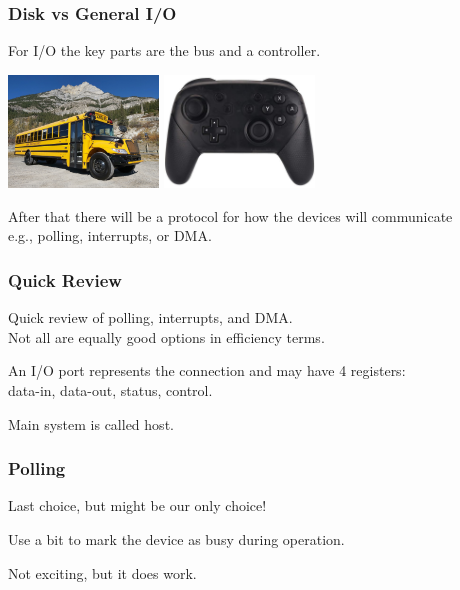 \begin{frame}
\frametitle{Disk vs General I/O}

For I/O the key parts are the bus and a controller. 

\begin{center}
	\includegraphics[width=0.3\textwidth]{images/bus.jpg}
	\includegraphics[width=0.3\textwidth]{images/controller.jpg}
\end{center}

After that there will be a protocol for how the devices will communicate\\
\quad e.g., polling, interrupts, or DMA.

\end{frame}


\begin{frame}
\frametitle{Quick Review}

Quick review of polling, interrupts, and DMA.\\
\quad Not all are equally good options in efficiency terms.

An I/O port represents the connection and may have 4 registers:\\
\quad data-in, data-out, status, control.

Main system is called \alert{host}.

\end{frame}


\begin{frame}
\frametitle{Polling}

Last choice, but might be our only choice!

Use a bit to mark the device as busy during operation.

Not exciting, but it does work.

\end{frame}



